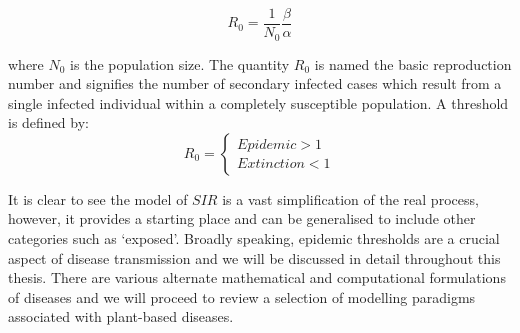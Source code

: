 \begin{equation}
    R_0=\frac{1}{N_0} \frac{\beta}{\alpha}
\end{equation}

where $N_0$ is the population size. The quantity $R_0$ is named the basic reproduction number and signifies the number of secondary infected cases which result from a single infected individual within a completely susceptible population. A threshold is defined by:
\[
  R_0=\begin{cases}
              Epidemic >1\\
              Extinction <1
            \end{cases}
\]

 It is clear to see the  model of $SIR$ is a vast simplification of the real process, however, it provides a starting place and can be generalised to include other categories such as `exposed'. Broadly speaking, epidemic thresholds are a crucial aspect of disease transmission and we will be discussed in detail throughout this thesis. There are various alternate mathematical and computational formulations of diseases \citep[see][]{review_} and we will proceed to review a selection of modelling paradigms associated with plant-based diseases. 
